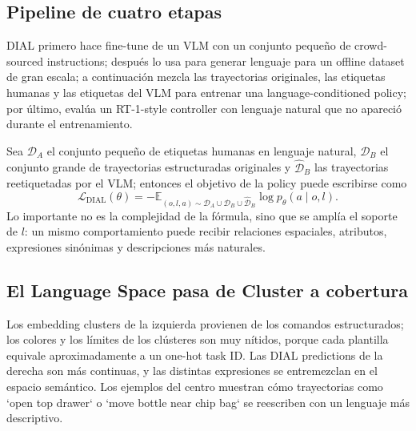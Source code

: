 
\subsection{Pipeline de cuatro etapas}

DIAL primero hace fine-tune de un VLM con un conjunto pequeño de crowd-sourced instructions; después lo usa para generar lenguaje para un offline dataset de gran escala; a continuación mezcla las trayectorias originales, las etiquetas humanas y las etiquetas del VLM para entrenar una language-conditioned policy; por último, evalúa un RT-1-style controller con lenguaje natural que no apareció durante el entrenamiento.


Sea $\mathcal{D}_A$ el conjunto pequeño de etiquetas humanas en lenguaje natural, $\mathcal{D}_B$ el conjunto grande de trayectorias estructuradas originales y $\hat{\mathcal{D}}_B$ las trayectorias reetiquetadas por el VLM; entonces el objetivo de la policy puede escribirse como
\begin{equation}
\mathcal{L}_{\mathrm{DIAL}}(\theta)
=-\mathbb{E}_{(o,l,a)\sim
\mathcal{D}_A\cup\mathcal{D}_B\cup\hat{\mathcal{D}}_B}
\log p_{\theta}(a\mid o,l).
\end{equation}
Lo importante no es la complejidad de la fórmula, sino que se amplía el soporte de $l$: un mismo comportamiento puede recibir relaciones espaciales, atributos, expresiones sinónimas y descripciones más naturales.

\subsection{El Language Space pasa de Cluster a cobertura}

Los embedding clusters de la izquierda provienen de los comandos estructurados; los colores y los límites de los clústeres son muy nítidos, porque cada plantilla equivale aproximadamente a un one-hot task ID. Las DIAL predictions de la derecha son más continuas, y las distintas expresiones se entremezclan en el espacio semántico. Los ejemplos del centro muestran cómo trayectorias como `open top drawer` o `move bottle near chip bag` se reescriben con un lenguaje más descriptivo.

